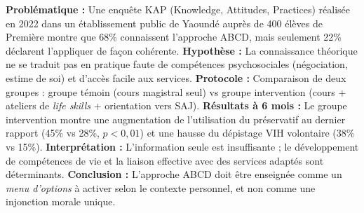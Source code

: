 \documentclass[11pt]{article}
\begin{document}
\begin{experience}
\textbf{Problématique :} Une enquête KAP (Knowledge, Attitudes, Practices) réalisée en 2022 dans un établissement public de Yaoundé auprès de 400 élèves de Première montre que 68\% connaissent l'approche ABCD, mais seulement 22\% déclarent l'appliquer de façon cohérente.
\textbf{Hypothèse :} La connaissance théorique ne se traduit pas en pratique faute de compétences psychosociales (négociation, estime de soi) et d'accès facile aux services.
\textbf{Protocole :} Comparaison de deux groupes : groupe témoin (cours magistral seul) vs groupe intervention (cours + ateliers de \emph{life skills} + orientation vers SAJ).
\textbf{Résultats à 6 mois :} Le groupe intervention montre une augmentation de l'utilisation du préservatif au dernier rapport (45\% vs 28\%, $p<0,01$) et une hausse du dépistage VIH volontaire (38\% vs 15\%).
\textbf{Interprétation :} L'information seule est insuffisante ; le développement de compétences de vie et la liaison effective avec des services adaptés sont déterminants.
\textbf{Conclusion :} L'approche ABCD doit être enseignée comme un \emph{menu d'options} à activer selon le contexte personnel, et non comme une injonction morale unique.
\end{experience}
\end{document}
